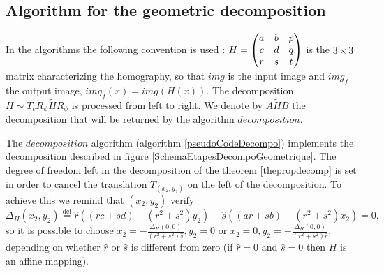 \subsection{Algorithm for the geometric decomposition}
 
 In the algorithms the following convention is used : $H = \begin{pmatrix} a&b&p\\c&d&q\\r&s&t \end{pmatrix}$ is the $3\times 3$ matrix characterizing the homography, so that $img$ is the input image and $img_f$ the output image, $img_f(x) = img(H(x))$. The decomposition $H \sim T_{c} R_{\psi}  \tilde H R_{\phi}$ is processed from left to right. We denote by $A \tilde H B$ the decomposition that will be returned by the algorithm $decomposition$. 
 
 
 The $decomposition$ algorithm (algorithm \ref{pseudoCodeDecompo}) implements the decomposition described in figure \ref{SchemaEtapesDecompoGeometrique}. The degree of freedom left in the decomposition of the theorem \ref{thepropdecomp} is set in order to cancel the translation $T_{(x_2,y_2)}$ on  the left of the decomposition. To achieve this we remind that $(x_2,y_2)$ verify
 \begin{equation}
 \Delta_H(x_2 , y_2 ) \stackrel{\text{def}}{=} \hat r ((rc+sd)-(r^2 + s^2)y_2) - \hat s ((ar+sb)-(r^2 + s^2 )x_2) = 0,
 \label{equationAlgo6}
 \end{equation}
 so it is possible to choose $x_2 = -\frac{\Delta_H(0,0)}{(r^2+s^2)\hat s}, y_2 = 0$ or $x_2 = 0, y_2 = -\frac{\Delta_H(0,0)}{(r^2+s^2)\hat r}$, depending on whether $\hat r$ or $\hat s$ is different from zero (if $\hat r=0$ and $\hat s=0$ then $H$ is an affine mapping). 
 
 
